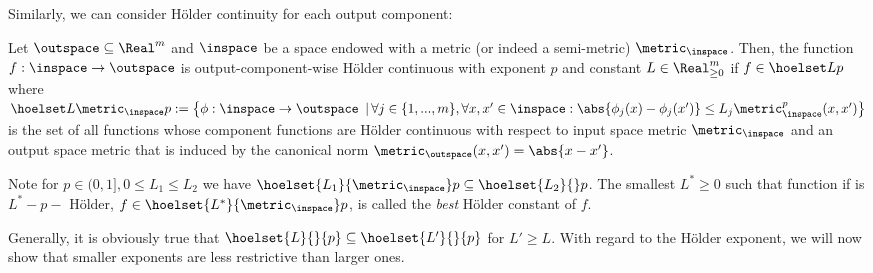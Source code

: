 Similarly, we can consider H\"older continuity for each output component: 

\begin{defn} \label{def:outputwisehoelder}
Let $\outspace \subseteq \Real^m $ and $\inspace$ be a space endowed with a metric (or indeed a semi-metric) $\metric_\inspace$. Then, the function $f: \inspace \to \outspace$ is output-component-wise H\"older continuous with exponent $p$ and constant $L \in \Real^m_{\geq 0}$ if $f \in \hoelset L { } p$ where
$\hoelset L {\metric_\inspace} p:= \bigl\{ \phi: \inspace \to \outspace \,\ | \, \forall j \in \{1,...,m \}, \forall x,x' \in \inspace: \abs{\phi_j(x) - \phi_j(x')} \leq L_j \metric^p_\inspace(x,x') \bigr\}$
is the set of all functions whose component functions are H\"older continuous with respect to input space metric $\metric_\inspace$ and an output space metric that is induced by the canonical norm $\metric_{\outspace} (x,x')= \abs{x-x'}$.  
\end{defn}

\begin{remark}
Note for $p \in (0,1], 0 \leq L_1 \leq L_2$ we have $\hoelset {L_1} {\metric_\inspace} p \subseteq \hoelset {L_2} { } p$. The smallest $L^* \geq 0$ such that function if is $L^*-p-$ H\"older, $f \in \hoelset {L^*} {\metric_\inspace} p$, is called the \emph{best} H\"older constant of $f$.
\end{remark}

Generally, it is obviously true that $\hoelset{L}{}{p} \subseteq \hoelset{L'}{}{p}$ for $L' \geq L$.
With regard to the H\"older exponent, we will now show that smaller exponents are less restrictive than larger ones. 




